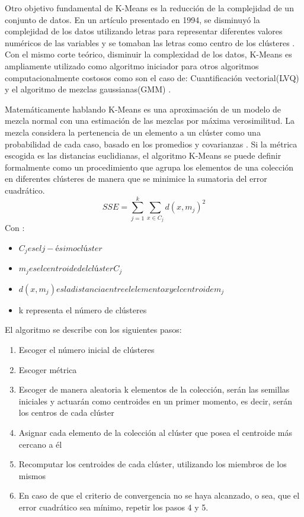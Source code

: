 Otro objetivo fundamental de K-Means es la reducción de la complejidad de un conjunto de datos. En un artículo presentado en 1994, se disminuyó la complejidad de los datos utilizando letras para representar diferentes valores numéricos de las variables y se tomaban las letras como centro de los clústeres \cite{faber1994clustering}. Con el mismo corte teórico, disminuir la complexidad de los datos, K-Means es ampliamente utilizado como algoritmo iniciador para otros algoritmos computacionalmente costosos como son el caso de: Cuantificación vectorial(LVQ) y el algoritmo de mezclas gaussianas(GMM) \cite{Shannon2001AMT}.

Matemáticamente hablando K-Means es una aproximación de un modelo de mezcla normal con una estimación de las mezclas por máxima verosimilitud. La mezcla considera la pertenencia de un elemento a un clúster como una probabilidad de cada caso, basado en los promedios y covarianzas \cite{Symons1981ClusteringCA}.
Si la métrica escogida es las distancias euclidianas, el algoritmo K-Means se puede definir formalmente como un procedimiento que agrupa los elementos de una colección en diferentes clústeres de manera que se minimice la sumatoria del error cuadrático.
\begin{equation}
SSE = \sum_{j = 1}^{k} \sum_{x \in C_j} d(x,m_j)^2
\end{equation}
Con : 
\begin{itemize}
	
	\item 	$C_j es el j-ésimo clúster$ 
	
	\item $	m_j es el centroide del clúster  C_j $
	\item $	d(x, m_j) es la distancia entre el elemento x y el centroide m_j$
	\item k representa el número de clústeres
	
\end{itemize}
El algoritmo se describe con los siguientes pasos: 
\begin{enumerate}
	
	\item 	Escoger el número inicial de clústeres
	
	\item Escoger métrica
	\item Escoger de manera aleatoria k elementos de la colección, serán las semillas iniciales y actuarán como centroides en un primer momento, es decir, serán los centros de cada clúster 
	\item Asignar cada elemento de la colección al clúster que posea el centroide más cercano a él 
	\item Recomputar los centroides de cada clúster, utilizando los miembros de los mismos
	\item En caso de que el criterio de convergencia no se haya alcanzado, o sea, que el error cuadrático sea mínimo, repetir los pasos 4 y 5.
	
\end{enumerate}

